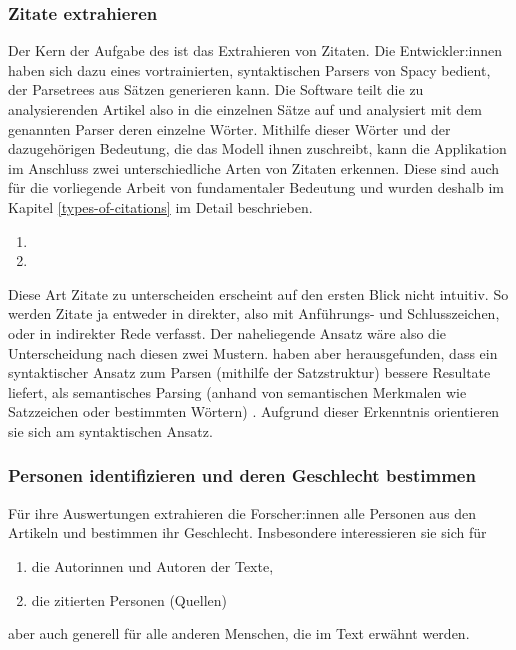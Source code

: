 \subsubsection{Zitate extrahieren}\label{ggt-method-citation}

Der Kern der Aufgabe des  ist das Extrahieren von Zitaten. Die Entwickler:innen haben sich dazu eines vortrainierten, syntaktischen Parsers von Spacy bedient,
der Parsetrees aus Sätzen generieren kann. Die Software teilt die zu analysierenden Artikel also in die einzelnen Sätze auf und analysiert mit dem genannten Parser deren
einzelne Wörter. Mithilfe dieser Wörter und der dazugehörigen Bedeutung, die das Modell ihnen zuschreibt, kann die Applikation im Anschluss
zwei unterschiedliche Arten von Zitaten erkennen. Diese sind auch für die vorliegende Arbeit
von fundamentaler Bedeutung und wurden deshalb im Kapitel \ref{types-of-citations} im
Detail beschrieben.
\begin{enumerate}
    \item {}
    \item {}
\end{enumerate}

Diese Art Zitate zu unterscheiden erscheint auf den ersten Blick nicht intuitiv. So werden Zitate ja entweder in direkter, also mit Anführungs-
und Schlusszeichen, oder in indirekter Rede verfasst. Der naheliegende Ansatz wäre also die Unterscheidung nach diesen zwei Mustern. \citeauthor{SpronckNikitina+2019+119+159}
haben aber herausgefunden, dass ein syntaktischer Ansatz zum Parsen (mithilfe der Satzstruktur) bessere Resultate liefert, als semantisches Parsing (anhand von semantischen Merkmalen
wie Satzzeichen oder bestimmten Wörtern) \cite{SpronckNikitina+2019+119+159}. Aufgrund dieser Erkenntnis orientieren sie sich am syntaktischen Ansatz.

\subsubsection{Personen identifizieren und deren Geschlecht bestimmen}

Für ihre Auswertungen extrahieren die Forscher:innen alle Personen aus den Artikeln und bestimmen ihr Geschlecht.
Insbesondere interessieren sie sich für
\begin{enumerate}
    \item die Autorinnen und Autoren der Texte,
    \item die zitierten Personen (Quellen)
\end{enumerate}
aber auch generell für alle anderen Menschen, die im Text erwähnt werden.

